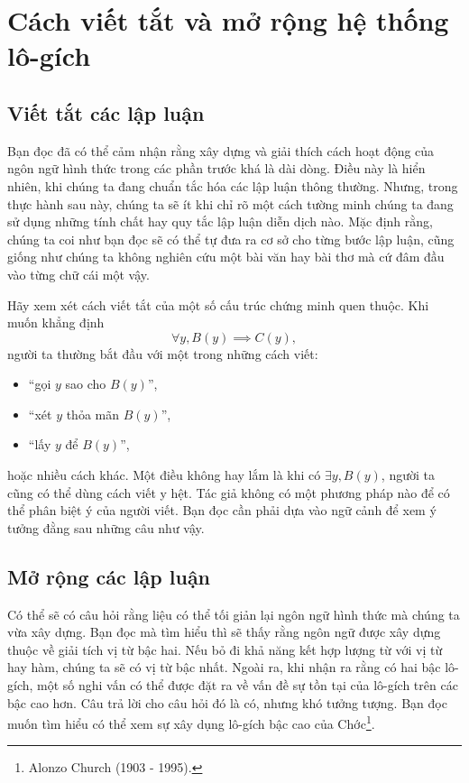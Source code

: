 \section{Cách viết tắt và mở rộng hệ thống lô-gích}

\subsection{Viết tắt các lập luận}

Bạn đọc đã có thể cảm nhận rằng xây dựng và giải thích cách hoạt động của ngôn ngữ hình thức trong các phần trước khá là dài dòng. Điều này là hiển nhiên, khi chúng ta đang chuẩn tắc hóa các lập luận thông thường. Nhưng, trong thực hành sau này, chúng ta sẽ ít khi chỉ rõ một cách tường minh chúng ta đang sử dụng những tính chất hay quy tắc lập luận diễn dịch nào. Mặc định rằng, chúng ta coi như bạn đọc sẽ có thể tự đưa ra cơ sở cho từng bước lập luận, cũng giống như chúng ta không nghiên cứu một bài văn hay bài thơ mà cứ đâm đầu vào từng chữ cái một vậy.

Hãy xem xét cách viết tắt của một số cấu trúc chứng minh quen thuộc. Khi muốn khẳng định \begin{equation*}
   \forall y, B(y) \implies C(y),
\end{equation*}
người ta thường bắt đầu với một trong những cách viết:
\begin{itemize}
   \item ``gọi $y$ sao cho $B(y)$'',
   \item ``xét $y$ thỏa mãn $B(y)$'',
   \item ``lấy $y$ để $B(y)$'',
\end{itemize}
hoặc nhiều cách khác. Một điều không hay lắm là khi có $\exists y, B(y)$, người ta cũng có thể dùng cách viết y hệt. Tác giả không có một phương pháp nào để có thể phân biệt ý của người viết. Bạn đọc cần phải dựa vào ngữ cảnh để xem ý tưởng đằng sau những câu như vậy.

\subsection{Mở rộng các lập luận}

Có thể sẽ có câu hỏi rằng liệu có thể tối giản lại ngôn ngữ hình thức mà chúng ta vừa xây dựng. Bạn đọc mà tìm hiểu thì sẽ thấy rằng ngôn ngữ được xây dựng thuộc về giải tích vị từ bậc hai. Nếu bỏ đi khả năng kết hợp lượng từ với vị từ hay hàm, chúng ta sẽ có vị từ bậc nhất. Ngoài ra, khi nhận ra rằng có hai bậc lô-gích, một số nghi vấn có thể được đặt ra về vấn đề sự tồn tại của lô-gích trên các bậc cao hơn. Câu trả lời cho câu hỏi đó là có, nhưng khó tưởng tượng. Bạn đọc muốn tìm hiểu có thể xem sự xây dụng lô-gích bậc cao của Chớc\footnote{Alonzo Church (1903 - 1995).}.


